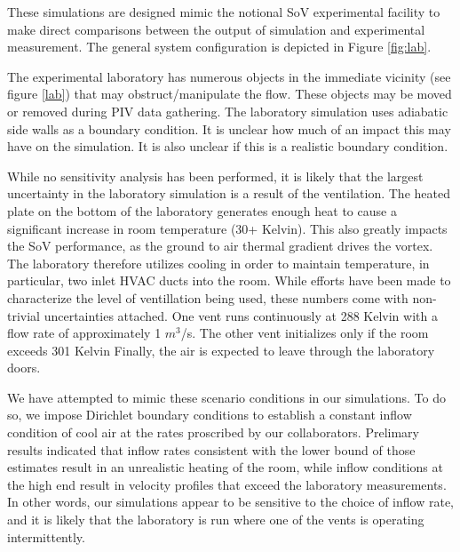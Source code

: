 

These simulations are designed mimic the notional SoV experimental
facility to make direct comparisons between the output of simulation and
experimental measurement. The general system configuration is depicted
in Figure \ref{fig:lab}. 

The experimental laboratory has numerous objects
in the immediate vicinity (see figure \ref{lab}) that may
obstruct/manipulate the flow. These objects may be moved or removed
during PIV data gathering. The laboratory simulation uses adiabatic side
walls as a boundary condition. It is unclear how much of an impact this
may have on the simulation. It is also unclear if this is a realistic
boundary condition. 

While no sensitivity analysis has been performed, it is likely that the
largest uncertainty in the laboratory simulation is a result of the
ventilation. The heated plate on the bottom of the laboratory
generates enough heat to cause a significant increase in room
temperature (30+ Kelvin). This also greatly impacts the SoV
performance, as the ground to air thermal gradient drives the
vortex. The laboratory therefore utilizes cooling in order to maintain
temperature, in particular, two inlet HVAC ducts into the room. While
efforts have been made to characterize the level of ventillation being
used, these numbers come with non-trivial uncertainties attached. One
vent runs continuously at 288 Kelvin with a flow rate of approximately 1 
$m^3$/s.
The other vent initializes only if the room exceeds 301 Kelvin
Finally, the air is expected to leave through the laboratory doors.

We have attempted to mimic these scenario conditions in our
simulations. To do so, we impose Dirichlet boundary conditions to
establish a constant inflow condition of cool air at the rates 
proscribed by our collaborators. Prelimary results indicated that 
inflow rates consistent with the lower bound of those estimates result in an
unrealistic heating of the room, while inflow conditions at the high end
result in velocity profiles that exceed the laboratory measurements. In
other words, our simulations appear to be sensitive to the choice of
inflow rate, and it is likely that the laboratory is run where one of
the vents is operating intermittently. 

